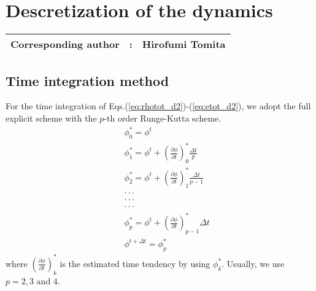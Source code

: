 \chapter{Descretization of the dynamics}
\label{chap:descretization dynamics}
{\bf \Large 
\begin{tabular}{ccc}
\hline
  Corresponding author & : & Hirofumi Tomita\\
\hline
\end{tabular}
}

\section{Time integration method}

For the time integration of Eqs.(\ref{eq:rhotot_d2})-(\ref{eq:etot_d2}),
we adopt the full explicit scheme with
the $p$-th order Runge-Kutta scheme.
\begin{eqnarray}
&& \phi^{*}_{0} = \phi^{t}\\
&&  \phi^{*}_{1} 
= \phi^{t} + \left(\frac{\partial \phi}{\partial t}\right)^{*}_{0}\frac{\Delta t}{p}\\
&&  \phi^{*}_{2} 
= \phi^{t} + \left(\frac{\partial \phi}{\partial t}\right)^{*}_{1}\frac{\Delta t}{p-1}\\
&&  \cdot \cdot \cdot\nonumber\\
&&  \cdot \cdot \cdot\nonumber\\
&&  \cdot \cdot \cdot\nonumber\\
&&  \phi^{*}_{p} = \phi^{t} + \left(\frac{\partial \phi}{\partial t}\right)^{*}_{p-1} \Delta t\\
&& \phi^{t+\Delta t} = \phi^{*}_{p}
\end{eqnarray}
where $\left(\frac{\partial \phi}{\partial t}\right)^{*}_{k}$ is 
the estimated time tendency by using $\phi^{*}_{k}$.
Usually, we use $p=2,3$ and $4$.

